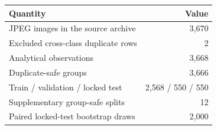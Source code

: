 \begin{tabular}{lr}
\toprule
Quantity & Value\\
\midrule
JPEG images in the source archive & 3,670\\
Excluded cross-class duplicate rows & 2\\
Analytical observations & 3,668\\
Duplicate-safe groups & 3,666\\
Train / validation / locked test & 2,568 / 550 / 550\\
Supplementary group-safe splits & 12\\
Paired locked-test bootstrap draws & 2,000\\
\bottomrule
\end{tabular}
